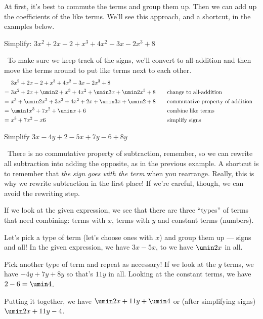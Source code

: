 At first, it's best to commute the terms and group them up. Then we can add up the coefficients of the like terms. We'll see this approach, and a shortcut, in the examples below.

\begin{boxedex}
Simplify: $3x^2 + 2x - 2 + x^3 + 4x^2 - 3x - 2x^3 + 8$

\exsoln\ To make sure we keep track of the signs, we'll convert to all-addition and then move the terms around to put like terms next to each other.
\[\begin{aligned}
	&~ 3x^2 + 2x - 2 + x^3 + 4x^2 - 3x - 2x^3 + 8\\
=	&~ 3x^2 + 2x + \umin2 + x^3 + 4x^2 + \umin3x + \umin2x^3 + 8
&& \quad \text{change to all-addition}\\
=	&~ x^3 + \umin2x^3 + 3x^2 + 4x^2 + 2x + \umin3x + \umin2 + 8
&& \quad \text{commutative property of addition}\\
=	&~ \umin1x^3 + 7x^2 + \umin x + 6
&& \quad \text{combine like terms}\\
=	&~ x^3 + 7x^2 - x 6
&& \quad \text{simplify signs}\\
\end{aligned}\]
\end{boxedex}

\begin{boxedex}
Simplify $3x-4y+2-5x+7y-6+8y$

\exsoln\ There is no commutative property of subtraction, remember, so we can rewrite all subtraction into adding the opposite, as in the previous example. A shortcut is to remember that \textit{the sign goes with the term} when you rearrange. Really, this is why we rewrite subtraction in the first place! If we're careful, though, we can avoid the rewriting step.

If we look at the given expression, we see that there are three ``types'' of terms that need combining: terms with $x$, terms with $y$ and constant terms (numbers).

Let's pick a type of term (let's choose ones with $x$) and group them up --- signs and all! In the given expression, we have $3x-5x$, to we have $\umin2x$ in all.

Pick another type of term and repeat as necessary! If we look at the $y$ terms, we have $-4y+7y+8y$ so that's $11y$ in all. Looking at the constant terms, we have $2-6 = \umin4$.

Putting it together, we have $\umin2x + 11y + \umin4$ or (after simplifying signs) $\umin2x + 11y -4$.
\end{boxedex}


